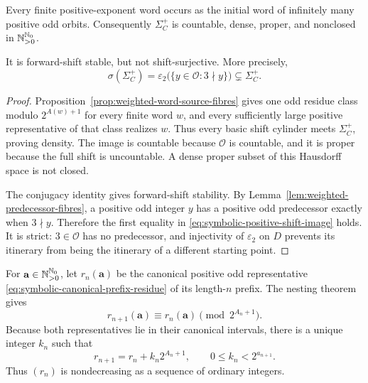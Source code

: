 \begin{theorem}
\label{thm:symbolic-positive-language-density}
Every finite positive-exponent word occurs as the initial word of infinitely
many positive odd orbits.  Consequently $\Sigma_C^+$ is countable, dense,
proper, and nonclosed in $\mathbb{N}_{>0}^{\mathbb{N}_{0}}$.

It is forward-shift stable, but not shift-surjective.  More precisely,
\begin{equation}
\label{eq:symbolic-positive-shift-image}
 \sigma(\Sigma_C^+)
 =\varepsilon_2\bigl(\{y\in\mathcal O:3\nmid y\}\bigr)
 \subsetneq\Sigma_C^+.
\end{equation}
\end{theorem}

\begin{proof}
Proposition~\ref{prop:weighted-word-source-fibres} gives one odd residue
class modulo $2^{A(w)+1}$ for every finite word $w$, and every sufficiently
large positive representative of that class realizes $w$.  Thus every
basic shift cylinder meets $\Sigma_C^+$, proving density.  The image is
countable because $\mathcal O$ is countable, and it is proper because the
full shift is uncountable.  A dense proper subset of this Hausdorff space is
not closed.

The conjugacy identity gives forward-shift stability.  By
Lemma~\ref{lem:weighted-predecessor-fibres}, a positive odd integer $y$ has
a positive odd predecessor exactly when $3\nmid y$.  Therefore the first
equality in \eqref{eq:symbolic-positive-shift-image} holds.  It is strict:
$3\in\mathcal O$ has no predecessor, and injectivity of $\varepsilon_2$ on
$D$ prevents its itinerary from being the itinerary of a different starting
point.
\end{proof}

For $\mathbf a\in\mathbb{N}_{>0}^{\mathbb{N}_{0}}$, let $r_n(\mathbf a)$ be the canonical
positive odd representative \eqref{eq:symbolic-canonical-prefix-residue} of
its length-$n$ prefix.  The nesting theorem gives
\begin{equation}
\label{eq:symbolic-canonical-residue-nesting}
 r_{n+1}(\mathbf a)\equiv r_n(\mathbf a)
 \pmod{2^{A_n+1}}.
\end{equation}
Because both representatives lie in their canonical intervals, there is a
unique integer $k_n$ such that
\begin{equation}
\label{eq:symbolic-canonical-residue-increment}
 r_{n+1}=r_n+k_n2^{A_n+1},
 \qquad 0\leq k_n<2^{a_{n+1}}.
\end{equation}
Thus $(r_n)$ is nondecreasing as a sequence of ordinary integers.

